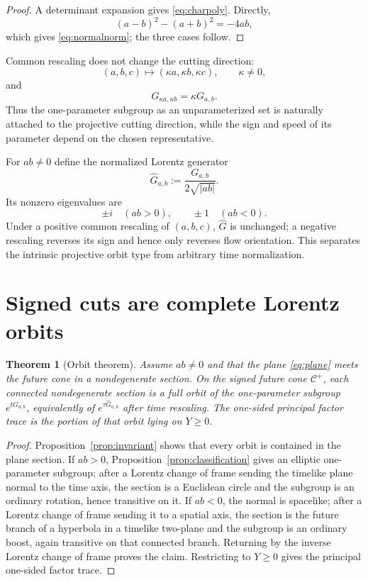 \documentclass[11pt]{amsart}
\newtheorem{theorem}{Theorem}[section]
\theoremstyle{remark}
\begin{document}
\begin{proof}
A determinant expansion gives \eqref{eq:charpoly}.  Directly,
\[
(a-b)^2-(a+b)^2=-4ab,
\]
which gives \eqref{eq:normalnorm}; the three cases follow.
\end{proof}

Common rescaling does not change the cutting direction:
\[
(a,b,c)\mapsto(\kappa a,\kappa b,\kappa c),
\qquad \kappa\ne0,
\]
and
\[
G_{\kappa a,\kappa b}=\kappa G_{a,b}.
\]
Thus the one-parameter subgroup as an unparameterized set is naturally attached to the projective cutting direction, while the sign and speed of its parameter depend on the chosen representative.

For $ab\ne0$ define the normalized Lorentz generator
\begin{equation}\label{eq:Ghat}
\boxed{
\widehat G_{a,b}:=\frac{G_{a,b}}{2\sqrt{|ab|}}.
}
\end{equation}
Its nonzero eigenvalues are
\[
\pm i\quad(ab>0),
\qquad
\pm1\quad(ab<0).
\]
Under a positive common rescaling of $(a,b,c)$, $\widehat G$ is unchanged; a negative rescaling reverses its sign and hence only reverses flow orientation.  This separates the intrinsic projective orbit type from arbitrary time normalization.

\section{Signed cuts are complete Lorentz orbits}

\begin{theorem}[Orbit theorem]\label{thm:orbit}
Assume $ab\ne0$ and that the plane \eqref{eq:plane} meets the future cone in a nondegenerate section.  On the signed future cone $\mathcal C^+$, each connected nondegenerate section is a full orbit of the one-parameter subgroup $e^{tG_{a,b}}$, equivalently of $e^{\tau\widehat G_{a,b}}$ after time rescaling.  The one-sided principal factor trace is the portion of that orbit lying on $Y\ge0$.
\end{theorem}

\begin{proof}
Proposition~\ref{prop:invariant} shows that every orbit is contained in the plane section.  If $ab>0$, Proposition~\ref{prop:classification} gives an elliptic one-parameter subgroup; after a Lorentz change of frame sending the timelike plane normal to the time axis, the section is a Euclidean circle and the subgroup is an ordinary rotation, hence transitive on it.  If $ab<0$, the normal is spacelike; after a Lorentz change of frame sending it to a spatial axis, the section is the future branch of a hyperbola in a timelike two-plane and the subgroup is an ordinary boost, again transitive on that connected branch.  Returning by the inverse Lorentz change of frame proves the claim.  Restricting to $Y\ge0$ gives the principal one-sided factor trace.
\end{proof}
\end{document}
